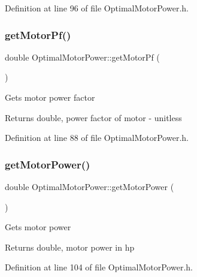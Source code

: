 Definition at line 96 of file Optimal\+Motor\+Power.\+h.

\mbox{\label{class_optimal_motor_power_a94d4c8a84c1bd19b799e35b966368f5a}} 
\subsubsection{\texorpdfstring{get\+Motor\+Pf()}{getMotorPf()}}
{\footnotesize\ttfamily double Optimal\+Motor\+Power\+::get\+Motor\+Pf (\begin{DoxyParamCaption}{ }\end{DoxyParamCaption})\hspace{0.3cm}{\ttfamily [inline]}}

Gets motor power factor \begin{DoxyReturn}{Returns}
double, power factor of motor -\/ unitless 
\end{DoxyReturn}


Definition at line 88 of file Optimal\+Motor\+Power.\+h.

\mbox{\label{class_optimal_motor_power_af35a32c24df9198bcf0df5b8f6ea03a9}} 
\subsubsection{\texorpdfstring{get\+Motor\+Power()}{getMotorPower()}}
{\footnotesize\ttfamily double Optimal\+Motor\+Power\+::get\+Motor\+Power (\begin{DoxyParamCaption}{ }\end{DoxyParamCaption})\hspace{0.3cm}{\ttfamily [inline]}}

Gets motor power \begin{DoxyReturn}{Returns}
double, motor power in hp 
\end{DoxyReturn}


Definition at line 104 of file Optimal\+Motor\+Power.\+h.

\mbox{\label{class_optimal_motor_power_a7d6e976abf406c54637d3b51e098d7c8}} 
